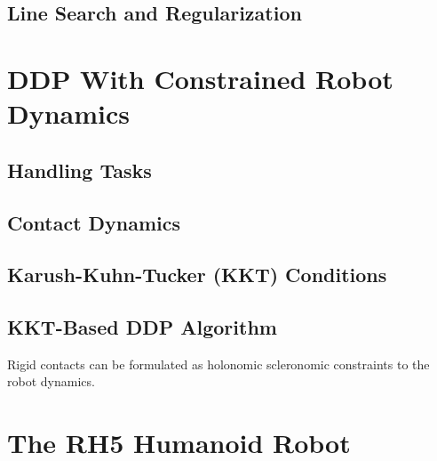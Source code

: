 \subsection{Line Search and Regularization}

\section{DDP With Constrained Robot Dynamics}
\subsection{Handling Tasks}
\subsection{Contact Dynamics}
\subsection{Karush-Kuhn-Tucker (KKT) Conditions}
\subsection{KKT-Based DDP Algorithm}
Rigid contacts can be formulated as holonomic scleronomic constraints to the robot dynamics. 

\section{The RH5 Humanoid Robot}
